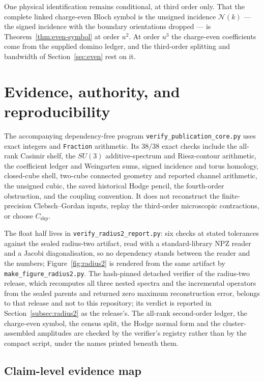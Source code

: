\documentclass[11pt]{article}
\theoremstyle{plain}
\theoremstyle{definition}
\theoremstyle{remark}
\begin{document}
One physical identification remains conditional, at third order only. That
the complete linked charge-even Bloch symbol is the unsigned incidence
$\mathcal N(k)$ --- the signed incidence with the boundary orientations
dropped --- is Theorem~\ref{thm:even-symbol} at order $u^2$. At order $u^3$
the charge-even coefficients come from the supplied domino ledger, and the
third-order splitting and bandwidth of Section~\ref{sec:even} rest on it.

\section{Evidence, authority, and reproducibility}
\label{sec:repro}

The accompanying dependency-free program
\texttt{verify\_publication\_core.py} uses exact integers and
\texttt{Fraction} arithmetic. Its $38/38$ exact checks include the all-rank
Casimir shelf, the $SU(3)$ additive-spectrum and Riesz-contour arithmetic, the
coefficient ledger and Weingarten sums, signed incidence and torus homology, closed-cube shell,
two-cube connected geometry and reported channel arithmetic, the unsigned
cubic, the saved historical Hodge pencil, the fourth-order obstruction, and
the coupling convention. It does not reconstruct the finite-precision
Clebsch--Gordan inputs, replay the third-order microscopic contractions, or
choose $C_{\mathrm{shp}}$.

The float half lives in \texttt{verify\_radius2\_report.py}: six checks at
stated tolerances against the sealed radius-two artifact, read with a
standard-library NPZ reader and a Jacobi diagonalisation, so no dependency
stands between the reader and the numbers; Figure~\ref{fig:radius2} is
rendered from the same artifact by \texttt{make\_figure\_radius2.py}. The
hash-pinned detached verifier of the radius-two release, which recomputes all
three nested spectra and the incremental operators from the sealed parents and
returned zero maximum reconstruction error, belongs to that release and not to
this repository; its verdict is reported in Section~\ref{subsec:radius2} as
the release's. The all-rank second-order ledger, the charge-even symbol, the
census split, the Hodge normal form and the cluster-assembled amplitudes are
checked by the verifier's registry rather than by the compact script, under
the names printed beneath them.

\subsection{Claim-level evidence map}
\end{document}
